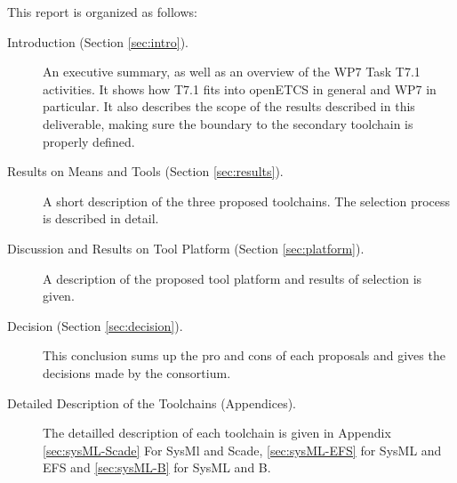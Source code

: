 This report is organized as follows:

\begin{description}
\item[Introduction (Section \ref{sec:intro}).] An executive summary, as well as an overview of the WP7 Task T7.1 activities.  It shows how T7.1 fits into openETCS in general and WP7 in particular.  It also describes the scope of the results described in this deliverable, making sure the boundary to the secondary toolchain is properly defined.

\item[Results on Means and Tools (Section \ref{sec:results}).] A short description of the three proposed toolchains.  The selection process is described in detail.

\item[Discussion and Results on Tool Platform (Section \ref{sec:platform}).] A description of the proposed tool platform and results of selection is given.

\item[Decision (Section \ref{sec:decision}).] This conclusion sums up  the pro and cons of each proposals and gives the decisions made by the consortium.

\item[Detailed Description of the Toolchains (Appendices).] The detailled description of each toolchain is given in Appendix \ref{sec:sysML-Scade} For SysMl and Scade, \ref{sec:sysML-EFS} for SysML and EFS and \ref{sec:sysML-B} for SysML and B.


\end{description}





